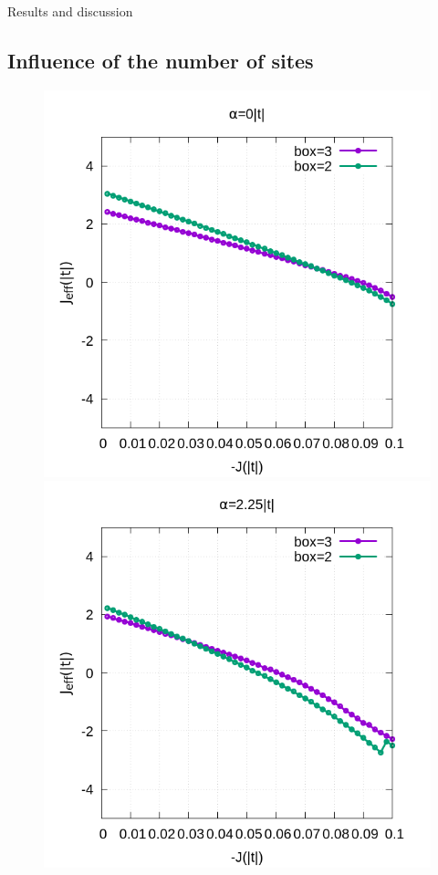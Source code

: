 \documentclass[12pt,twoside]{report}
\begin{document}
\begin{chapter}{Results and discussion}
	\subsection{Influence of the number of sites}
	\begin{figure}[h!]
		\centering
		\hspace{-2cm}
		\begin{minipage}{0.4\textwidth}
			\includegraphics[scale=0.4]{Jeff_vs_J_sites_3-xrep-0.png}
		\end{minipage}
		\hspace{2cm}
		\begin{minipage}{0.4\textwidth}
			\includegraphics[scale=0.4]{Jeff_vs_J_sites_3-xrep-225.png}

\end{minipage}
\end{figure}
\end{chapter}
\end{document}
